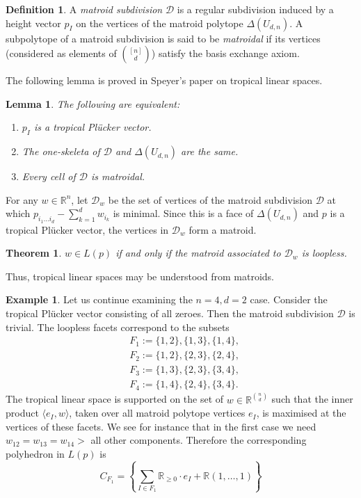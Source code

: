 \documentclass[12pt]{article}
\newtheorem{lem}{Lemma}
\newtheorem{thm}{Theorem}
\theoremstyle{definition}
\newtheorem{defn}{Definition}
\newtheorem{example}{Example}
\newcommand{\R}{\mathbb{R}}
\begin{document}
\begin{defn}
	A \textit{matroid subdivision} $\mathcal{D}$ is a regular subdivision induced by a height vector $p_I$ on the vertices of the matroid polytope $\Delta(U_{d,n})$. A subpolytope of a matroid subdivision is said to be \textit{matroidal} if its vertices (considered as elements of $\binom{[n]}{d}$) satisfy the basis exchange axiom.
\end{defn}
The following lemma is proved in Speyer's paper on tropical linear spaces.
\begin{lem}
	The following are equivalent:
	\begin{enumerate}
		\item $p_I$ is a tropical Pl\"ucker vector.
		\item The one-skeleta of $\mathcal{D}$ and $\Delta(U_{d,n})$ are the same.
		\item Every cell of $\mathcal{D}$ is matroidal.
	\end{enumerate}
\end{lem}
For any $w \in \R^n$, let $\mathcal{D}_w$ be the set of vertices of the matroid subdivision $\mathcal{D}$ at which $p_{i_1\dots i_d} - \sum_{k=1}^{d} w_{i_k}$ is minimal. Since this is a face of $\Delta(U_{d,n})$ and $p$ is a tropical Pl\"ucker vector, the vertices in $\mathcal{D}_w$ form a matroid.
\begin{thm}
	$w \in L(p)$ if and only if the matroid associated to $\mathcal{D}_w$ is loopless.
\end{thm}
Thus, tropical linear spaces may be understood from matroids.
\begin{example}
	Let us continue examining the $n=4,d=2$ case. Consider the tropical Pl\"ucker vector consisting of all zeroes. Then the matroid subdivision $\mathcal{D}$ is trivial. The loopless facets correspond to the subsets
	\begin{align*}
		&F_1 := \{1,2\}, \{1,3\}, \{1,4\}, \\
		&F_2 := \{1,2\},\{2,3\},\{2,4\}, \\
		&F_3 := \{1,3\},\{2,3\},\{3,4\}, \\
		&F_4 := \{1,4\},\{2,4\},\{3,4\}.
	\end{align*}
The tropical linear space is supported on the set of $w \in \R^{\binom{n}{d}}$ such that the inner product $\langle e_I, w \rangle$, taken over all matroid polytope vertices $e_I$, is maximised at the vertices of these facets. We see for instance that in the first case we need $w_{12}=w_{13}=w_{14}>$ all other components. Therefore the corresponding polyhedron in $L(p)$ is
\[
C_{F_1} = \left\{ \sum_{I \in F_1} \R_{\geq 0}\cdot e_I + \R(1,\dots,1) \right\}
\]
\end{example}
\end{document}
